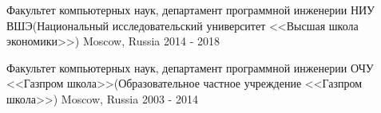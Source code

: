 


\begin{cventries}
\cventry
{Факультет компьютерных наук, департамент программной инженерии} %
{НИУ ВШЭ(Национальный исследовательский университет <<Высшая школа экономики>>)} %
{Moscow, Russia} %
{2014 - 2018} %
{ %
}


\cventry
{Факультет компьютерных наук, департамент программной инженерии} %
{ОЧУ <<Газпром школа>>(Образовательное частное учреждение <<Газпром школа>>)} %
{Moscow, Russia} %
{2003 - 2014} %
{ %
}


\end{cventries}